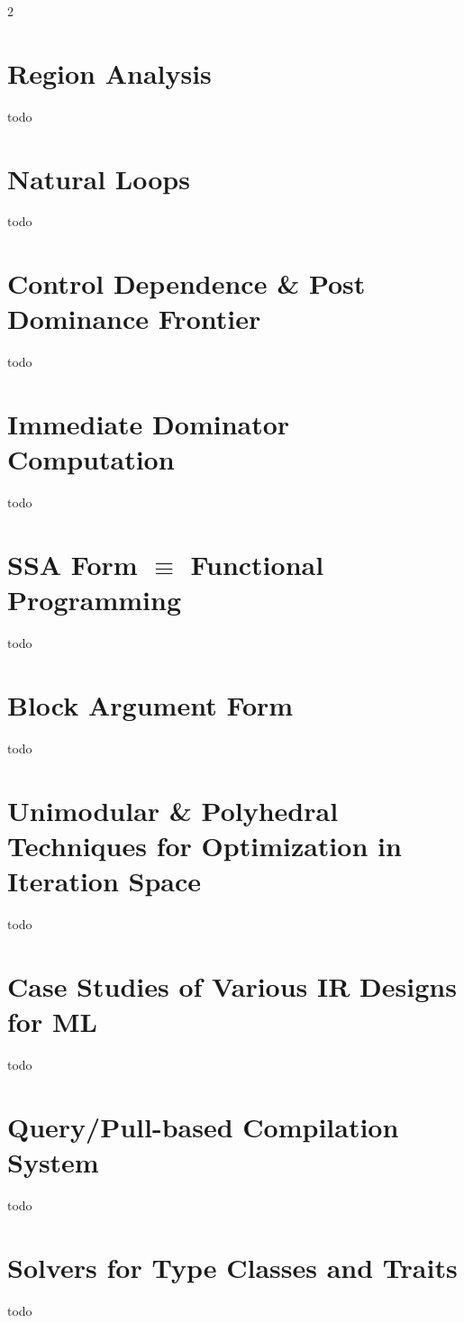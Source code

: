 \documentclass[8pt]{extarticle}
\begin{document}
\begin{multicols*}{2}
  \section{Region Analysis}
  todo

  \section{Natural Loops}
  todo

  \section{Control Dependence \& Post Dominance Frontier}
  todo

  \section{Immediate Dominator Computation}
  todo

  \section{SSA Form $\equiv$ Functional Programming}
  todo

  \section{Block Argument Form}
  todo

  \section{Unimodular \& Polyhedral Techniques for Optimization in Iteration Space}
  todo

  \section{Case Studies of Various IR Designs for ML}
  todo

  \section{Query/Pull-based Compilation System}
  todo

  \section{Solvers for Type Classes and Traits}
  todo

  \vfill\null
  \columnbreak



    
\end{multicols*}
\end{document}
